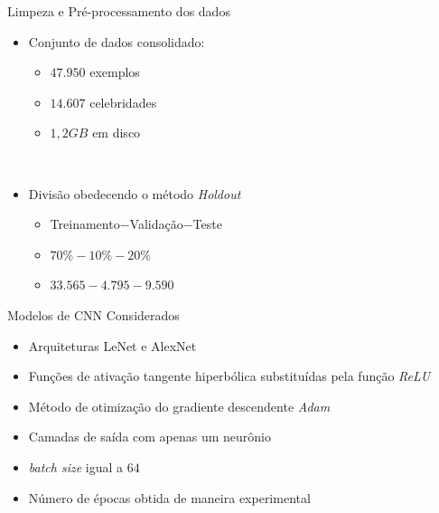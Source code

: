 \begin{frame}{Limpeza e Pré-processamento dos dados}
     \begin{itemize}
          \item Conjunto de dados consolidado:
          \begin{itemize}
               \item $47.950$ exemplos
               \item $14.607$ celebridades
               \item $1,2 GB$ em disco
          \end{itemize}
          \ \ \newline
          \item Divisão obedecendo o método \emph{Holdout}
          \begin{itemize}
               \item Treinamento$-$Validação$-$Teste
               \item $70\%-10\%-20\%$
               \item $33.565-4.795-9.590$
          \end{itemize}
     \end{itemize}
\end{frame}

\begin{frame}{Modelos de CNN Considerados}
     \begin{itemize}
          \item Arquiteturas LeNet e AlexNet
          \ \ \newline
          \item Funções de ativação tangente hiperbólica substituídas pela função \emph{ReLU}
          \item Método de otimização do gradiente descendente \emph{Adam}
          \ \ \newline
          \item Camadas de saída com apenas um neurônio
          \item \emph{batch size} igual a $64$
          \item Número de épocas obtida de maneira experimental
     \end{itemize}
\end{frame}

